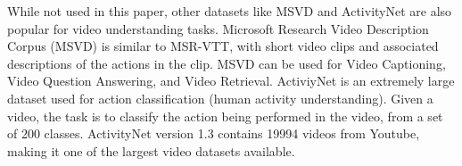 While not used in this paper, other datasets like MSVD \cite{msvd} and ActivityNet \cite{activitynet} are also popular for video understanding tasks.
Microsoft Research Video Description Corpus (MSVD) is similar to MSR-VTT, with short video clips and associated descriptions of the actions in the clip.
MSVD can be used for Video Captioning, Video Question Answering, and Video Retrieval.
ActiviyNet is an extremely large dataset used for action classification (human activity understanding).
Given a video, the task is to classify the action being performed in the video, from a set of 200 classes.
ActivityNet version 1.3 contains 19994 videos from Youtube, making it one of the largest video datasets available.
